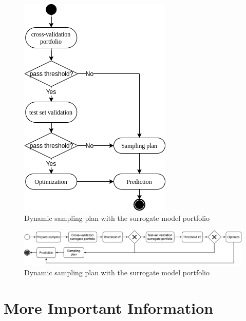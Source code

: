 \documentclass[ms,english]{stthesis}
\begin{document}
        \begin{figure}
            \centering
            \includegraphics[width=\textwidth]{content/images/simplify_activity_workflow}
            \caption[Workflow 2]{Dynamic sampling plan with the surrogate model portfolio}
            \label{fig:workflow_2}
        \end{figure}

        \begin{figure}
            \centering
            \includegraphics[width=\textwidth]{content/images/simsim_activity_workflow}
            \caption[Workflow 3]{Dynamic sampling plan with the surrogate model portfolio}
            \label{fig:workflow_3}
        \end{figure}

    \section{More Important Information}
    \lipsum[1] 
    

\end{document}
